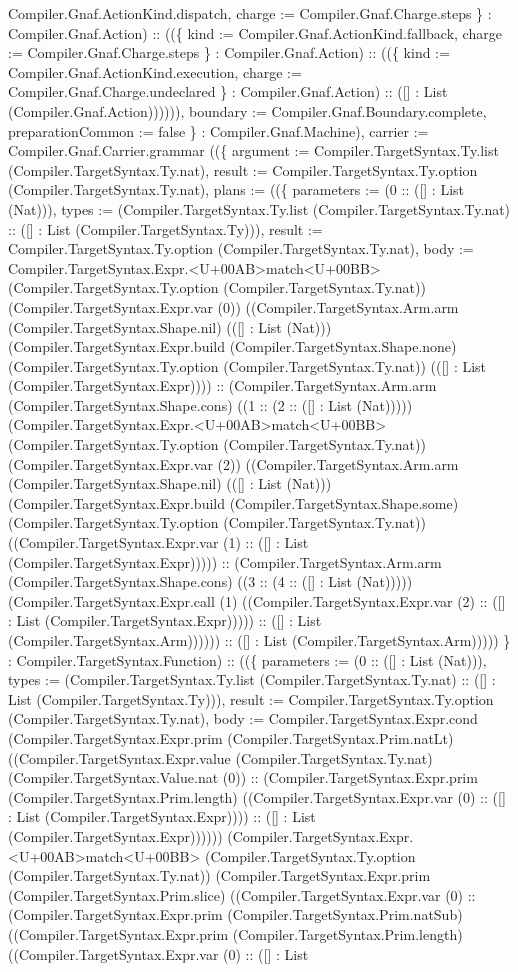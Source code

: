 \documentclass[11pt]{article}
\begin{document}
Compiler.Gnaf.ActionKind.dispatch, charge := Compiler.Gnaf.Charge.steps \} : Compiler.Gnaf.Action) :: ((\{ kind := Compiler.Gnaf.ActionKind.fallback, charge := Compiler.Gnaf.Charge.steps \} : Compiler.Gnaf.Action) :: ((\{ kind := Compiler.Gnaf.ActionKind.execution, charge := Compiler.Gnaf.Charge.undeclared \} : Compiler.Gnaf.Action) :: ([] : List (Compiler.Gnaf.Action)))))), boundary := Compiler.Gnaf.Boundary.complete, preparationCommon := false \} : Compiler.Gnaf.Machine), carrier := Compiler.Gnaf.Carrier.grammar ((\{ argument := Compiler.TargetSyntax.Ty.list (Compiler.TargetSyntax.Ty.nat), result := Compiler.TargetSyntax.Ty.option (Compiler.TargetSyntax.Ty.nat), plans := ((\{ parameters := (0 :: ([] : List (Nat))), types := (Compiler.TargetSyntax.Ty.list (Compiler.TargetSyntax.Ty.nat) :: ([] : List (Compiler.TargetSyntax.Ty))), result := Compiler.TargetSyntax.Ty.option (Compiler.TargetSyntax.Ty.nat), body := Compiler.TargetSyntax.Expr.<U+00AB>match<U+00BB> (Compiler.TargetSyntax.Ty.option (Compiler.TargetSyntax.Ty.nat)) (Compiler.TargetSyntax.Expr.var (0)) ((Compiler.TargetSyntax.Arm.arm (Compiler.TargetSyntax.Shape.nil) (([] : List (Nat))) (Compiler.TargetSyntax.Expr.build (Compiler.TargetSyntax.Shape.none) (Compiler.TargetSyntax.Ty.option (Compiler.TargetSyntax.Ty.nat)) (([] : List (Compiler.TargetSyntax.Expr)))) :: (Compiler.TargetSyntax.Arm.arm (Compiler.TargetSyntax.Shape.cons) ((1 :: (2 :: ([] : List (Nat))))) (Compiler.TargetSyntax.Expr.<U+00AB>match<U+00BB> (Compiler.TargetSyntax.Ty.option (Compiler.TargetSyntax.Ty.nat)) (Compiler.TargetSyntax.Expr.var (2)) ((Compiler.TargetSyntax.Arm.arm (Compiler.TargetSyntax.Shape.nil) (([] : List (Nat))) (Compiler.TargetSyntax.Expr.build (Compiler.TargetSyntax.Shape.some) (Compiler.TargetSyntax.Ty.option (Compiler.TargetSyntax.Ty.nat)) ((Compiler.TargetSyntax.Expr.var (1) :: ([] : List (Compiler.TargetSyntax.Expr))))) :: (Compiler.TargetSyntax.Arm.arm (Compiler.TargetSyntax.Shape.cons) ((3 :: (4 :: ([] : List (Nat))))) (Compiler.TargetSyntax.Expr.call (1) ((Compiler.TargetSyntax.Expr.var (2) :: ([] : List (Compiler.TargetSyntax.Expr))))) :: ([] : List (Compiler.TargetSyntax.Arm)))))) :: ([] : List (Compiler.TargetSyntax.Arm))))) \} : Compiler.TargetSyntax.Function) :: ((\{ parameters := (0 :: ([] : List (Nat))), types := (Compiler.TargetSyntax.Ty.list (Compiler.TargetSyntax.Ty.nat) :: ([] : List (Compiler.TargetSyntax.Ty))), result := Compiler.TargetSyntax.Ty.option (Compiler.TargetSyntax.Ty.nat), body := Compiler.TargetSyntax.Expr.cond (Compiler.TargetSyntax.Expr.prim (Compiler.TargetSyntax.Prim.natLt) ((Compiler.TargetSyntax.Expr.value (Compiler.TargetSyntax.Ty.nat) (Compiler.TargetSyntax.Value.nat (0)) :: (Compiler.TargetSyntax.Expr.prim (Compiler.TargetSyntax.Prim.length) ((Compiler.TargetSyntax.Expr.var (0) :: ([] : List (Compiler.TargetSyntax.Expr)))) :: ([] : List (Compiler.TargetSyntax.Expr)))))) (Compiler.TargetSyntax.Expr.<U+00AB>match<U+00BB> (Compiler.TargetSyntax.Ty.option (Compiler.TargetSyntax.Ty.nat)) (Compiler.TargetSyntax.Expr.prim (Compiler.TargetSyntax.Prim.slice) ((Compiler.TargetSyntax.Expr.var (0) :: (Compiler.TargetSyntax.Expr.prim (Compiler.TargetSyntax.Prim.natSub) ((Compiler.TargetSyntax.Expr.prim (Compiler.TargetSyntax.Prim.length) ((Compiler.TargetSyntax.Expr.var (0) :: ([] : List 
\end{document}
